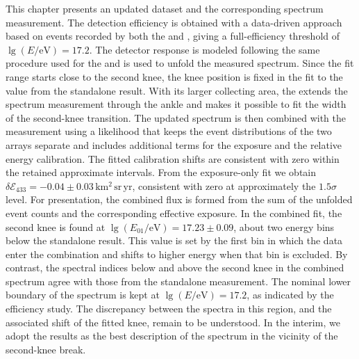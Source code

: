 \documentclass[main.tex]{subfiles}
\begin{document}
This chapter presents an updated  dataset and the corresponding spectrum measurement.
The detection efficiency is obtained with a data-driven approach based on events recorded by both the  and , giving a full-efficiency threshold of $\lg(E/\mathrm{eV})=17.2$.
The detector response is modeled following the same procedure used for the  and is used to unfold the measured spectrum.
Since the  fit range starts close to the second knee, the knee position is fixed in the fit to the value from the standalone  result.
With its larger collecting area, the  extends the spectrum measurement through the ankle and makes it possible to fit the width of the second-knee transition.
The updated  spectrum is then combined with the  measurement using a likelihood that keeps the event distributions of the two arrays separate and includes additional terms for the  exposure and the relative energy calibration.
The fitted calibration shifts are consistent with zero within the retained approximate intervals.
From the exposure-only fit we obtain $\delta\mathcal E_{433}=-0.04\pm0.03\,\mathrm{km^2\,sr\,yr}$, consistent with zero at approximately the $1.5\sigma$ level.
For presentation, the combined flux is formed from the sum of the unfolded event counts and the corresponding effective exposure.
In the combined fit, the second knee is found at $\lg(E_{01}/\mathrm{eV})=17.23\pm0.09$, about two energy bins below the standalone  result.
This value is set by the first bin in which the  data enter the combination and shifts to higher energy when that bin is excluded.
By contrast, the spectral indices below and above the second knee in the combined spectrum agree with those from the standalone  measurement.
The nominal lower boundary of the  spectrum is kept at $\lg(E/\mathrm{eV})=17.2$, as indicated by the efficiency study.
The discrepancy between the spectra in this region, and the associated shift of the fitted knee, remain to be understood.
In the interim, we adopt the  results as the best description of the spectrum in the vicinity of the second-knee break.


\end{document}

